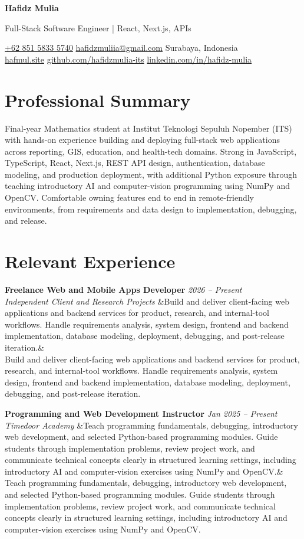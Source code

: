 \documentclass[a4paper,11pt]{article}
\newcommand{\cvname}[1]{%
  {\centering\LARGE\bfseries #1\par\vspace{2pt}}%
}
\newcommand{\cvtitle}[1]{%
  {\centering\large\color{accent} #1\par\vspace{4pt}}%
}
\newcommand{\cvcontact}[1]{%
  {\centering\small #1\par\vspace{6pt}}%
}
\newcommand{\cventry}[4]{%
  \noindent\textbf{#1} \hfill \textit{#3} \\
  \textit{#2}
  \ifx&#4& \else \\ \small #4 \fi
  \vspace{6pt}
}
\begin{document}
\cvname{Hafidz Mulia}
\cvtitle{Full-Stack Software Engineer | React, Next.js, APIs}
\cvcontact{%
  \href{tel:+6285158335740}{+62 851 5833 5740} \quad\textbar\quad
  \href{mailto:hafidzmuliia@gmail.com}{hafidzmuliia@gmail.com} \quad\textbar\quad
  Surabaya, Indonesia \\
  \href{https://hafmul.site}{hafmul.site} \quad\textbar\quad
  \href{https://github.com/hafidzmulia-its}{github.com/hafidzmulia-its} \quad\textbar\quad
  \href{https://www.linkedin.com/in/hafidz-mulia/}{linkedin.com/in/hafidz-mulia}
}

\section{Professional Summary}
Final-year Mathematics student at Institut Teknologi Sepuluh Nopember (ITS) with hands-on experience building and deploying full-stack web applications across reporting, GIS, education, and health-tech domains. Strong in JavaScript, TypeScript, React, Next.js, REST API design, authentication, database modeling, and production deployment, with additional Python exposure through teaching introductory AI and computer-vision programming using NumPy and OpenCV. Comfortable owning features end to end in remote-friendly environments, from requirements and data design to implementation, debugging, and release.

\section{Relevant Experience}
\cventry
  {Freelance Web and Mobile Apps Developer}
  {Independent Client and Research Projects}
  {2026 -- Present}
  {Build and deliver client-facing web applications and backend services for product, research, and internal-tool workflows. Handle requirements analysis, system design, frontend and backend implementation, database modeling, deployment, debugging, and post-release iteration.}

\cventry
  {Programming and Web Development Instructor}
  {Timedoor Academy}
  {Jan 2025 -- Present}
  {Teach programming fundamentals, debugging, introductory web development, and selected Python-based programming modules. Guide students through implementation problems, review project work, and communicate technical concepts clearly in structured learning settings, including introductory AI and computer-vision exercises using NumPy and OpenCV.}
\end{document}
